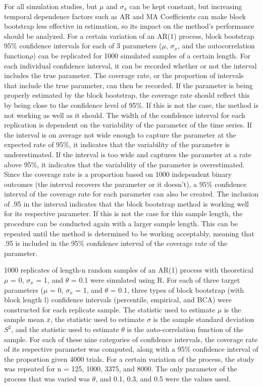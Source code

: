 \documentclass[12pt, letterpaper, titlepage]{article}
\begin{document}
For all simulation studies, but $\mu$ and $\sigma_{x}$ can be kept constant, but increasing temporal dependence factors such as AR and MA Coefficients can make block bootstrap less effective in estimation, so its impact on the method's performance should be analyzed. For a certain variation of an AR(1) process, block bootstrap 95\% confidence intervals for each of 3 parameters ($\mu$, $\sigma_{x}$, and the autocorrelation function$\rho$) can be replicated for 1000 simulated samples of a certain length. For each individual confidence interval, it can be recorded whether or not the interval includes the true parameter. The coverage rate, or the proportion of intervals that include the true parameter, can then be recorded. If the parameter is being properly estimated by the block bootstrap, the coverage rate should reflect this by being close to the confidence level of 95\%. If this is not the case, the method is not working as well as it should. The width of the confidence interval for each replication is dependent on the variability of the parameter of the time series. If the interval is on average not wide enough to capture the parameter at the expected rate of 95\%, it indicates that the variability of the parameter is underestimated. If the interval is too wide and captures the parameter at a rate above 95\%, it indicates that the variability of the parameter is overestimated. Since the coverage rate is a proportion based on 1000 independent binary outcomes (the interval recovers the parameter or it doesn't), a 95\% confidence interval of the coverage rate for each parameter can also be created. The inclusion of .95 in the interval indicates that the block bootstrap method is working well for its respective parameter. If this is not the case for this sample length, the procedure can be conducted again with a larger sample length. This can be repeated until the method is determined to be working acceptably, meaning that .95 is included in the 95\% confidence interval of the coverage rate of the parameter.



1000 replicates of length-n random samples of an AR(1) process with theoretical $\mu$ = 0, $\sigma_{x}$ = 1, and $\theta$ = 0.1 were simulated using R. For each of three target parameters ($\mu$ = 0, $\sigma_{x}$ = 1, and $\theta$ = 0.1, three types of block bootstrap (with block length l) confidence intervals (percentile, empirical, and BCA) were constructed for each replicate sample. The statistic used to estimate $\mu$ is the sample mean $\bar{x}$, the statistic used to estimate $\sigma$ is the sample standard deviation $S^2$, and the statistic used to estimate $\theta$ is the auto-correlation function of the sample. For each of these nine categories of confidence intervals, the coverage rate of its respective parameter was computed, along with a 95\% confidence interval of the proportion given 4000 trials. For a certain variation of the process, the study was repeated for n = 125, 1000, 3375, and 8000. The only parameter of the process that was varied was $\theta$, and 0.1, 0.3, and 0.5 were the values used.
\end{document}
